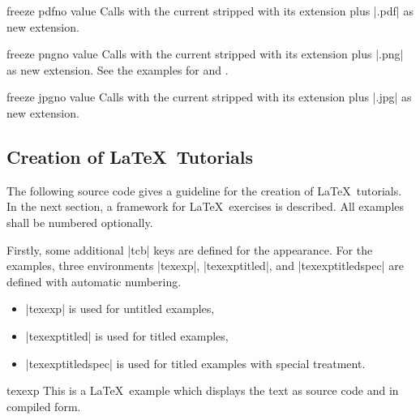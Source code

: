 \begin{docTcbKey}[][doc new=2016-07-14]{freeze pdf}{}{no value}
  Calls  with the current 
  stripped with its extension plus |.pdf| as new extension.
\end{docTcbKey}

\begin{docTcbKey}[][doc new=2016-07-14]{freeze png}{}{no value}
  Calls  with the current 
  stripped with its extension plus |.png| as new extension.
  See the examples for  and .
\end{docTcbKey}

\begin{docTcbKey}[][doc new=2016-07-14]{freeze jpg}{}{no value}
  Calls  with the current 
  stripped with its extension plus |.jpg| as new extension.
\end{docTcbKey}




\clearpage
\subsection{Creation of \LaTeX\ Tutorials}\label{sec:latextutorial}
The following source code gives a guideline for the creation of \LaTeX\ tutorials.
In the next section, a framework for \LaTeX\ exercises is described.
All examples shall be numbered optionally.

Firstly, some additional |tcb| keys are defined for the appearance.
For the examples, three environments |texexp|, |texexptitled|,
and |texexptitledspec| are defined with automatic numbering.

\begin{itemize}
\item |texexp| is used for untitled examples,
\item |texexptitled| is used for titled examples,
\item |texexptitledspec| is used for titled examples with special treatment.
\end{itemize}


\begin{dispExample}
\begin{tcblisting}{texexp}
This is a \LaTeX\ example which displays the text as source code
and in compiled form.
\end{tcblisting}
\end{dispExample}


